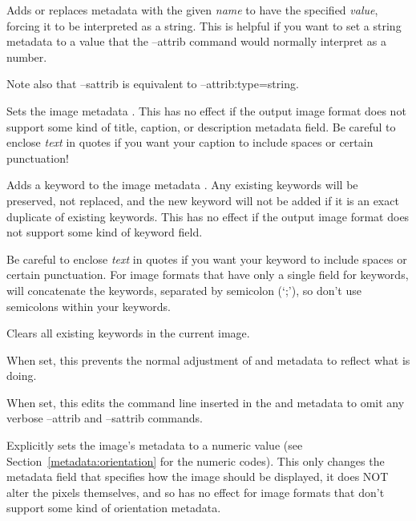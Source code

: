 Adds or replaces metadata with the given \emph{name} to have the
specified \emph{value}, forcing it to be interpreted as a {\cf string}.
This is helpful if you want to set a {\cf string} metadata to a value
that the {\cf --attrib} command would normally interpret as a number.

\noindent Note also that {\cf --sattrib} is equivalent to {\cf --attrib:type=string}.
\apiend

Sets the image metadata .
This has no effect if the output image format does not support some kind
of title, caption, or description metadata field.
Be careful to enclose \emph{text} in quotes if you want your caption to
include spaces or certain punctuation!
\apiend

Adds a keyword to the image metadata .  Any existing
keywords will be preserved, not replaced, and the new keyword will not
be added if it is an exact duplicate of existing keywords.  This has no
effect if the output image format does not support some kind of keyword
field.  

Be careful to enclose \emph{text} in quotes if you want your keyword to
include spaces or certain punctuation.  For image formats that have only
a single field for keywords, \OpenImageIO will concatenate the keywords,
separated by semicolon (`;'), so don't use semicolons within your
keywords.
\apiend

Clears all existing keywords in the current image.
\apiend

When set, this prevents the normal adjustment of  and
 metadata to reflect what \oiiotool is doing.
\apiend

When set, this edits the command line inserted in the  and
 metadata to omit any verbose {\cf --attrib} and
{\cf --sattrib} commands.
\apiend

Explicitly sets the image's  metadata to a numeric
value (see Section~\ref{metadata:orientation} for the numeric codes).
This only changes the metadata field that specifies
how the image should be displayed, it does NOT alter the pixels
themselves, and so has no effect for image formats that don't
support some kind of orientation metadata.
\apiend

